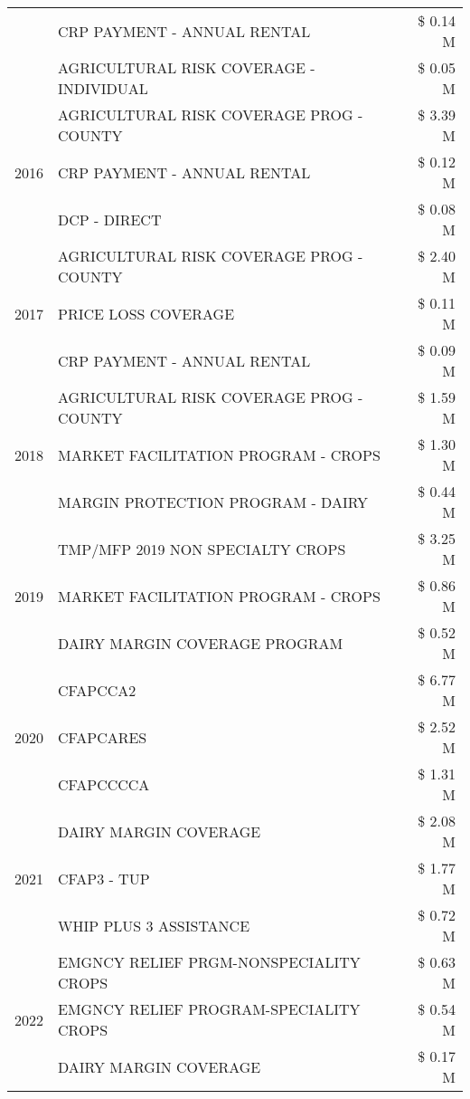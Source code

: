 \begin{tabular}{llr}
 & CRP PAYMENT - ANNUAL RENTAL & \$ 0.14 M \\
 & AGRICULTURAL RISK COVERAGE - INDIVIDUAL & \$ 0.05 M \\
\cline{1-3}
\multirow[t]{3}{*}{2016} & AGRICULTURAL RISK COVERAGE PROG - COUNTY & \$ 3.39 M \\
 & CRP PAYMENT - ANNUAL RENTAL & \$ 0.12 M \\
 & DCP - DIRECT & \$ 0.08 M \\
\cline{1-3}
\multirow[t]{3}{*}{2017} & AGRICULTURAL RISK COVERAGE PROG - COUNTY & \$ 2.40 M \\
 & PRICE LOSS COVERAGE & \$ 0.11 M \\
 & CRP PAYMENT - ANNUAL RENTAL & \$ 0.09 M \\
\cline{1-3}
\multirow[t]{3}{*}{2018} & AGRICULTURAL RISK COVERAGE PROG - COUNTY & \$ 1.59 M \\
 & MARKET FACILITATION PROGRAM - CROPS & \$ 1.30 M \\
 & MARGIN PROTECTION PROGRAM - DAIRY & \$ 0.44 M \\
\cline{1-3}
\multirow[t]{3}{*}{2019} & TMP/MFP 2019 NON SPECIALTY CROPS & \$ 3.25 M \\
 & MARKET FACILITATION PROGRAM - CROPS & \$ 0.86 M \\
 & DAIRY MARGIN COVERAGE PROGRAM & \$ 0.52 M \\
\cline{1-3}
\multirow[t]{3}{*}{2020} & CFAPCCA2 & \$ 6.77 M \\
 & CFAPCARES & \$ 2.52 M \\
 & CFAPCCCCA & \$ 1.31 M \\
\cline{1-3}
\multirow[t]{3}{*}{2021} & DAIRY MARGIN COVERAGE & \$ 2.08 M \\
 & CFAP3 - TUP & \$ 1.77 M \\
 & WHIP PLUS 3 ASSISTANCE & \$ 0.72 M \\
\cline{1-3}
\multirow[t]{3}{*}{2022} & EMGNCY RELIEF PRGM-NONSPECIALITY CROPS & \$ 0.63 M \\
 & EMGNCY RELIEF PROGRAM-SPECIALITY CROPS & \$ 0.54 M \\
 & DAIRY MARGIN COVERAGE & \$ 0.17 M \\
\cline{1-3}
\bottomrule
\end{tabular}
